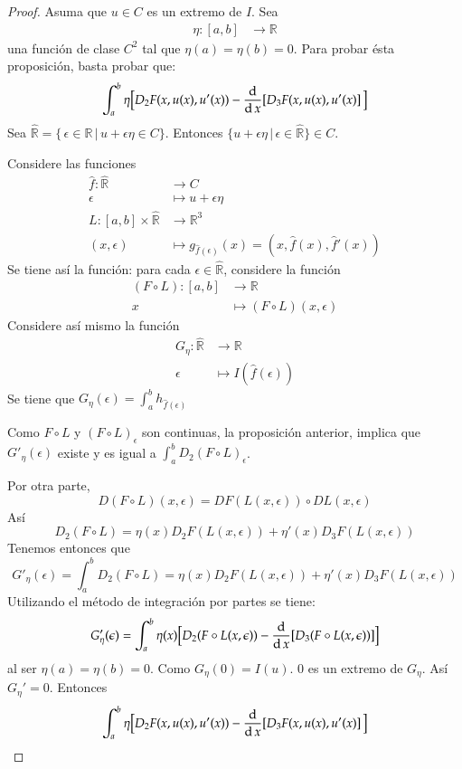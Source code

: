 \begin{proof}
 Asuma que $u \in C$ es un extremo de $I$.
 Sea 
 \begin{align*}
   \eta : [a,b] &\to \mathbb{R}
 \end{align*}
 una función de clase $C^2$ tal que $\eta(a) = \eta(b) = 0$. Para probar ésta
 proposición, basta probar que:
 \[
   \int_a^b \eta \big[ D_2F(x,u(x),u'(x)) - \frac{\diff}{\diff x}%
 [D_3 F(x, u(x), u'(x)] \, \big]
 \]
 Sea $\hat{\mathbb{R}} = \{ \, \epsilon \in \mathbb{R} \, | \, u + \epsilon\eta
   \in C \}$. Entonces $\{ u + \epsilon\eta \, | \, \epsilon \in
 \hat{\mathbb{R}}\} \in C$.

 Considere las funciones 
 \begin{align*}
   \hat{f}: \hat{\mathbb{R}} &\to C \\
   \epsilon  &\mapsto u + \epsilon\eta \\
   L : [a,b] \times \hat{\mathbb{R}} &\to \mathbb{R}^3 \\
   (x, \epsilon) &\mapsto g_{\hat{f}(\epsilon)}(x) = (x, \hat{f}(x),%
   \hat{f}'(x))
 \end{align*}
 Se tiene así la función:
 para cada $\epsilon \in \hat{\mathbb{R}}$, considere la función
 \begin{align*}
   (F \circ L): [a,b] &\to \mathbb{R} \\
   x &\mapsto (F \circ L)(x, \epsilon)
 \end{align*}
 Considere así mismo la función
 \begin{align*}
 G_{\eta} : \hat{\mathbb{R}} &\to \mathbb{R} \\
 \epsilon &\mapsto I(\hat{f}(\epsilon)) 
 \end{align*}
 Se tiene que $G_{\eta}(\epsilon) = \int_a^b h_{\hat{f}(\epsilon)}$

 Como $F\circ L$ y $(F \circ L)_{\epsilon}$ son continuas, la proposición
 anterior, implica que $G'_{\eta}(\epsilon)$ existe y es igual a $\int_a^b
 D_2(F\circ L)_{\epsilon}$.

 Por otra parte, 
 \[
   D(F\circ L)(x, \epsilon) = DF(L(x, \epsilon)) \circ DL(x, \epsilon)
 \]
 Así 
 \[
   D_2 (F \circ L) = \eta(x)D_2F(L(x, \epsilon)) + \eta'(x)%
 D_3F(L(x,\epsilon)) 
 \]
 Tenemos entonces que 
 \[
   G'_{\eta}(\epsilon) = \int_a^b%
   D_2 (F \circ L) = \eta(x)D_2F(L(x, \epsilon)) + \eta'(x)%
 D_3F(L(x,\epsilon))
 \]
 Utilizando el método de integración por partes se tiene:
 \[
   G_{\eta}'(\epsilon) = \int_a^b \eta(x)\big[D_2(F\circ L(x,\epsilon)) -%
   \frac{\diff}{\diff x} [D_3 (F\circ L(x,\epsilon))] \big] 
 \]
 al ser $\eta(a) = \eta(b) = 0$.
 Como $G_{\eta}(0) = I(u)$.  0 es un extremo de $G_{\eta}$. Así $G_{\eta}' = 0$.
 Entonces
 \[
   \int_a^b \eta \big[ D_2F(x,u(x),u'(x)) - \frac{\diff}{\diff x}%
 [D_3 F(x, u(x), u'(x)] \, \big]
 \]

\end{proof}

